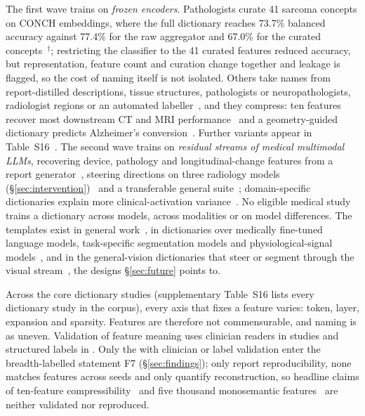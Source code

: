 The first wave trains on \emph{frozen encoders}. Pathologists curate 41 sarcoma concepts on CONCH
embeddings, where the full dictionary reaches 73.7\% balanced accuracy against 77.4\% for the raw
aggregator and 67.0\% for the curated concepts~\cite{bisson2026unsupervised}$^{\dagger}$; restricting the
classifier to the 41 curated features reduced accuracy, but representation, feature count and curation
change together and leakage is flagged, so the cost of naming itself is not isolated. Others take names
from report-distilled descriptions, tissue structures, pathologists or neuropathologists, radiologist
regions or an automated
labeller~\cite{abdulaal2024an,le2024learning,kim2026dissecting,zhao2026compositional,redlich2026explainable,nakka2025mammosae,renzulli2025medsae},
and they compress: ten features recover most downstream CT and MRI performance~\cite{wesp2026sparse} and
a geometry-guided dictionary predicts Alzheimer's conversion~\cite{nerrise2026geosae}. Further variants
appear in Table~S16~\cite{tang2025cxrlanic,sun2025prototypebased,dasdelen2025cytosae,yan2026a,huang2026classguided,chhetri2026when}.
The second wave trains on \emph{residual streams of medical multimodal LLMs}, recovering device,
pathology and longitudinal-change features from a report generator~\cite{bouzid2025insights}, steering
directions on three radiology models (\S\ref{sec:intervention})~\cite{nooralahzadeh2026universal} and a
transferable general suite~\cite{sadanandan2026mechanistically}; domain-specific dictionaries explain more
clinical-activation variance~\cite{oneill2025resurrecting}. No eligible medical study trains a dictionary
across models, across modalities or on model differences. The templates exist in general
work~\cite{thasarathan2025universal,nasirisarvi2025sparc,minder2025overcoming,plantinga2025from}, in
dictionaries over medically fine-tuned language models, task-specific segmentation models and
physiological-signal
models~\cite{tan2026efficient,ahmed2026medseglens,lehnschiler2026mechanistic,duan2026cadence}, and in the
general-vision dictionaries that steer or segment through the visual
stream~\cite{joseph2025steering,pach2025sparse,stevens2025interpretable}, the designs \S\ref{sec:future}
points to.

Across the \Nsae{} core dictionary studies (supplementary Table~S16 lists every
dictionary study in the corpus), every axis that fixes a feature varies:
token, layer, expansion and sparsity. Features are therefore not commensurable, and naming is as
uneven.
Validation of feature meaning uses clinician readers in \Nsaeclin{} studies and structured labels in
\Nsaelabel{}. Only the \Nsaeval{} with clinician or label validation enter the breadth-labelled statement
F7 (\S\ref{sec:findings}); only \Nsaestab{} report reproducibility, none matches features across seeds
and only \Nsaerecon{} quantify reconstruction, so headline claims of ten-feature
compressibility~\cite{wesp2026sparse} and five thousand monosemantic
features~\cite{tang2025cxrlanic} are neither validated nor reproduced.

